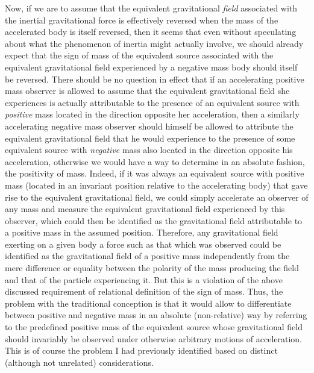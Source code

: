 \documentclass[notitlepage,12pt]{report}
\begin{document}
Now, if we are to assume that the equivalent gravitational \textit{field} associated with the inertial gravitational force is effectively reversed when the mass of the accelerated body is itself reversed, then it seems that even without speculating about what the phenomenon of inertia might actually involve, we should already expect that the sign of mass of the equivalent source associated with the equivalent gravitational field experienced by a negative mass body should itself be reversed. There should be no question in effect that if an accelerating positive mass observer is allowed to assume that the equivalent gravitational field she experiences is actually attributable to the presence of an equivalent source with \textit{positive} mass located in the direction opposite her acceleration, then a similarly accelerating negative mass observer should himself be allowed to attribute the equivalent gravitational field that he would experience to the presence of some equivalent source with \textit{negative} mass also located in the direction opposite his acceleration, otherwise we would have a way to determine in an absolute fashion, the positivity of mass. Indeed, if it was always an equivalent source with positive mass (located in an invariant position relative to the accelerating body) that gave rise to the equivalent gravitational field, we could simply accelerate an observer of any mass and measure the equivalent gravitational field experienced by this observer, which could then be identified as the gravitational field attributable to a positive mass in the assumed position. Therefore, any gravitational field exerting on a given body a force such as that which was observed could be identified as the gravitational field of a positive mass independently from the mere difference or equality between the polarity of the mass producing the field and that of the particle experiencing it. But this is a violation of the above discussed requirement of relational definition of the sign of mass. Thus, the problem with the traditional conception is that it would allow to differentiate between positive and negative mass in an absolute (non-relative) way by referring to the predefined positive mass of the equivalent source whose gravitational field should invariably be observed under otherwise arbitrary motions of acceleration. This is of course the problem I had previously identified based on distinct (although not unrelated) considerations.
\end{document}
